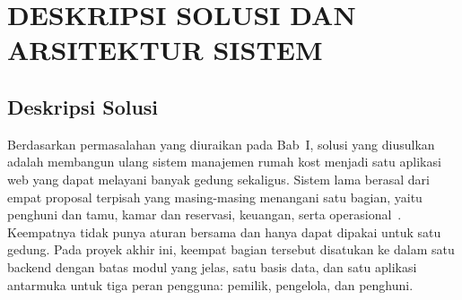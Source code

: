 \section{DESKRIPSI SOLUSI DAN ARSITEKTUR SISTEM}
\label{sec:deskripsi_solusi}

\subsection{Deskripsi Solusi}

Berdasarkan permasalahan yang diuraikan pada Bab~I, solusi yang diusulkan adalah membangun ulang sistem manajemen rumah kost menjadi satu aplikasi web yang dapat melayani banyak gedung sekaligus. Sistem lama berasal dari empat proposal terpisah yang masing-masing menangani satu bagian, yaitu penghuni dan tamu, kamar dan reservasi, keuangan, serta operasional~\cite{rasyidatur2025,roihanah2025,rizal2025,bagus2025}. Keempatnya tidak punya aturan bersama dan hanya dapat dipakai untuk satu gedung. Pada proyek akhir ini, keempat bagian tersebut disatukan ke dalam satu backend dengan batas modul yang jelas, satu basis data, dan satu aplikasi antarmuka untuk tiga peran pengguna: pemilik, pengelola, dan penghuni.

